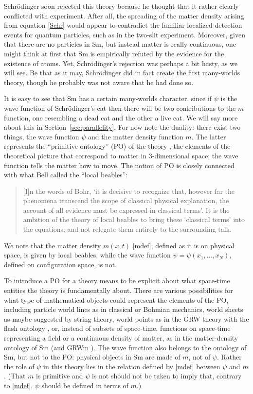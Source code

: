 \documentclass[12pt]{article}
\newcommand{\z}[1]{{#1}}
\begin{document}
Schr\"odinger soon rejected this theory because he thought that it rather clearly conflicted with experiment. After all, the spreading of the matter density arising from equation \eqref{Schr} would appear to contradict the familiar localized detection events for quantum particles, such as in the two-slit experiment. Moreover, given that there are no particles in Sm, but instead matter is really continuous, one might think at first that Sm is empirically refuted by the evidence for the existence of atoms. Yet, Schr\"odinger's rejection was perhaps a bit hasty, as we will see. Be that as it may, Schr\"odinger did in fact create the first many-worlds theory, though he probably was not aware that he had done so.

It is easy to see that Sm has a certain many-worlds character, since if $\psi$ is the wave function of Schr\"odinger's cat then there will be two contributions to the $m$ function, one resembling a dead cat and the other a live cat. We will say more about this in Section~\ref{sec:parallelity}. For now note the duality: there exist two things, the wave function $\psi$ and the matter density function $m$. The latter represents the ``primitive ontology'' (PO) of the theory \cite{AGTZ06}, the \z{elements of} the theoretical picture that correspond to matter in 3-dimensional space; the wave function tells the matter how to move. The notion of PO is closely connected with what Bell called the ``local beables'':
\begin{quote}
  [I]n the words of Bohr, `it is decisive to recognize that, however
  far the phenomena transcend the scope of classical physical
  explanation, the account of all evidence must be expressed in
  classical terms'. It is the ambition of the theory of local beables
  to bring these `classical terms' into the equations, and not
  relegate them entirely to the surrounding talk.\hfill \cite{Bell76}
\end{quote}
  \z{We note that the matter density $m(x,t)$ \eqref{mdef}, defined as it is on physical space, is given by local beables, while the wave function $\psi = \psi(x_1,\ldots, x_N)$, defined on configuration space, is not.}

To introduce a PO for a theory means to be explicit about what space-time entities the theory is fundamentally about. There are various possibilities for what type of mathematical objects could represent the elements of the PO, including particle world lines as in classical or Bohmian mechanics, world sheets as maybe suggested by string theory, world points as in the GRW theory with the flash ontology \cite{Bell87,Tum04,AGTZ06}, or, instead of subsets of space-time, functions on space-time representing a field or a continuous density of matter, as in the matter-density ontology of Sm (and GRWm \cite{AGTZ06}). The wave function also belongs to the ontology of Sm, but not to the PO:  physical objects \z{in Sm} are made of $m$, not of $\psi$. \z{Rather the role of $\psi$ in this theory lies in the relation defined by \eqref{mdef} between $\psi$ and $m$. (That $m$ is primitive and $\psi$ is not should not be taken to imply that, contrary to \eqref{mdef},  $\psi$ should be defined in terms of $m$.)}
\end{document}
